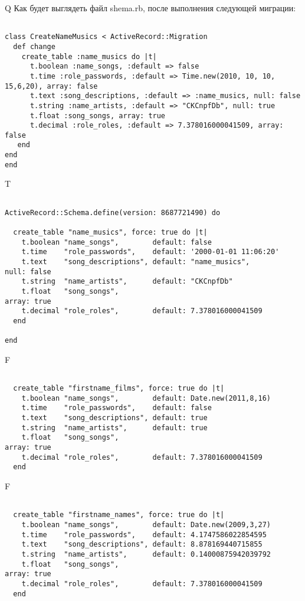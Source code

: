 Q
Как будет выглядеть файл shema.rb, после выполнения следующей миграции:

\begin{verbatim}

class CreateNameMusics < ActiveRecord::Migration 
  def change 
    create_table :name_musics do |t| 
      t.boolean :name_songs, :default => false
      t.time :role_passwords, :default => Time.new(2010, 10, 10, 15,6,20), array: false
      t.text :song_descriptions, :default => :name_musics, null: false
      t.string :name_artists, :default => "CKCnpfDb", null: true
      t.float :song_songs, array: true
      t.decimal :role_roles, :default => 7.378016000041509, array: false
   end
end
end
\end{verbatim}

T
\begin{verbatim}

ActiveRecord::Schema.define(version: 8687721490) do

  create_table "name_musics", force: true do |t|
    t.boolean "name_songs",        default: false
    t.time    "role_passwords",    default: '2000-01-01 11:06:20'
    t.text    "song_descriptions", default: "name_musics",         null: false
    t.string  "name_artists",      default: "CKCnpfDb"
    t.float   "song_songs",                                                     array: true
    t.decimal "role_roles",        default: 7.378016000041509
  end

end
\end{verbatim}


F
\begin{verbatim}

  create_table "firstname_films", force: true do |t|
    t.boolean "name_songs",        default: Date.new(2011,8,16)
    t.time    "role_passwords",    default: false
    t.text    "song_descriptions", default: true
    t.string  "name_artists",      default: true
    t.float   "song_songs",                                                     array: true
    t.decimal "role_roles",        default: 7.378016000041509
  end

\end{verbatim}

F
\begin{verbatim}

  create_table "firstname_names", force: true do |t|
    t.boolean "name_songs",        default: Date.new(2009,3,27)
    t.time    "role_passwords",    default: 4.1747586022854595
    t.text    "song_descriptions", default: 8.878169440715855
    t.string  "name_artists",      default: 0.14000875942039792
    t.float   "song_songs",                                                     array: true
    t.decimal "role_roles",        default: 7.378016000041509
  end

\end{verbatim}


